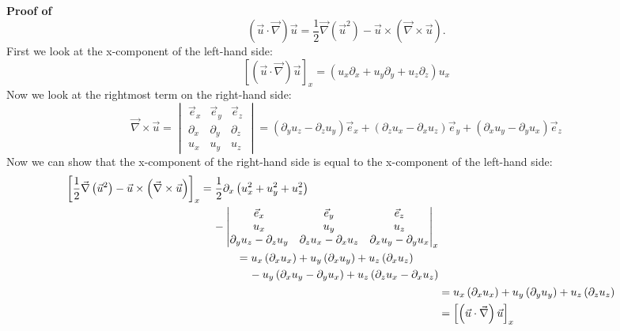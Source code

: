\begin{framed}
\textbf{Proof of}
\begin{equation}
\left(\vec{u}\cdot\vec{\nabla}\right)\vec{u}=\frac{1}{2}\vec{\nabla}\left(\vec{u}^2\right)-\vec{u}\times\left(\vec{\nabla}\times\vec{u}\right).
\end{equation}
First we look at the x-component of the left-hand side:
\begin{equation}
\left[\left(\vec{u}\cdot\vec{\nabla}\right)\vec{u}\right]_x = \left(u_x\partial_x+u_y\partial_y+u_z\partial_z\right)u_x
\end{equation}
Now we look at the rightmost term on the right-hand side:
\begin{equation}
\vec{\nabla}\times\vec{u} = \begin{vmatrix}
\vec{e}_x & \vec{e}_y & \vec{e}_z \\
\partial_x & \partial_y & \partial_z \\
u_x & u_y & u_z
\end{vmatrix} =
\left(\partial_yu_z-\partial_zu_y\right)\vec{e}_x +
\left(\partial_zu_x-\partial_xu_z\right)\vec{e}_y +
\left(\partial_xu_y-\partial_yu_x\right)\vec{e}_z
\end{equation}
Now we can show that the x-component of the right-hand side is equal to the x-component of the left-hand side:
\begin{align}
\begin{split}
\left[\frac{1}{2}\vec{\nabla}\left(\vec{u}^2\right)-\vec{u}\times\left(\vec{\nabla}\times\vec{u}\right)\right]_x &= \frac{1}{2}\partial_x\left(u_x^2+u_y^2+u_z^2\right)\\
&\hspace{4mm}- \begin{vmatrix}
\vec{e}_x & \vec{e}_y & \vec{e}_z \\
u_x & u_y & u_z \\
\partial_yu_z-\partial_zu_y & \partial_zu_x-\partial_xu_z & \partial_xu_y-\partial_yu_x
\end{vmatrix}_x
\end{split}\\
\begin{split}
&= u_x\left(\partial_xu_x\right) + u_y\left(\partial_xu_y\right) + u_z\left(\partial_xu_z\right)\\
&\hspace{4mm}- u_y\left(\partial_xu_y-\partial_yu_x\right) + u_z\left(\partial_zu_x-\partial_xu_z\right)
\end{split}\\
&= u_x\left(\partial_xu_x\right)+u_y\left(\partial_yu_y\right)+u_z\left(\partial_zu_z\right)\\
&= \left[\left(\vec{u}\cdot\vec{\nabla}\right)\vec{u}\right]_x
\end{align}
\end{framed}


